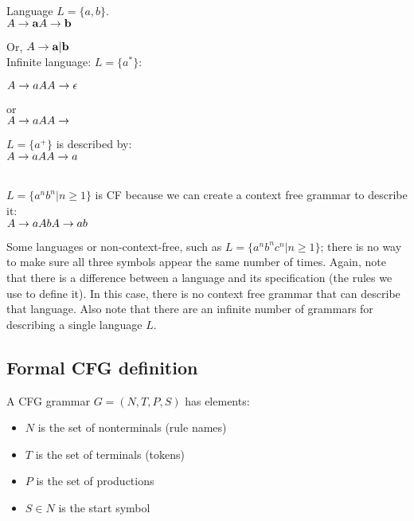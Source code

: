 \documentclass[11pt,twocolumn,nocopyright]{sigplanconf}
\begin{document}
\noindent Language $L = \{a,b\}$.\\

\noindent$
A \rightarrow {\bf a} \\
A \rightarrow {\bf b} \\
$

\noindent Or, $A \rightarrow {\bf a} | {\bf b}$\\

\noindent Infinite language: $L = \{a^*\}$:

\noindent $
A \rightarrow a A \\
A \rightarrow \epsilon \\
$

\noindent or\\

\noindent $
A \rightarrow a A \\
A \rightarrow \\
$

\noindent $L = \{a^+\}$ is described by:\\

\noindent $
A \rightarrow a A \\
A \rightarrow a\\
$

\\

\noindent $L = \{a^nb^n | n \ge 1\}$ is CF because we can create a context free grammar to describe it:\\

\noindent $
A \rightarrow a A b\\
A \rightarrow a b\\
$

Some languages or non-context-free, such as $L = \{a^nb^nc^n | n \ge 1\}$; there is no way to make sure all three symbols appear the same number of times.  Again, note that there is a difference between a language and its specification (the rules we use to define it). In this case, there is no context free grammar that can describe that language. Also note that there are an infinite number of grammars for describing a single language $L$.

\subsection{Formal CFG definition}

A CFG grammar $G = (N, T, P, S)$ has elements:

\vspace{-3pt}
\begin{itemize}\itemsep0pt \parskip0pt 
\item $N$ is the set of nonterminals (rule names)
\item $T$ is the set of terminals (tokens)
\item $P$ is the set of productions
\item $S \in N$ is the start symbol
\end{itemize}
\end{document}
